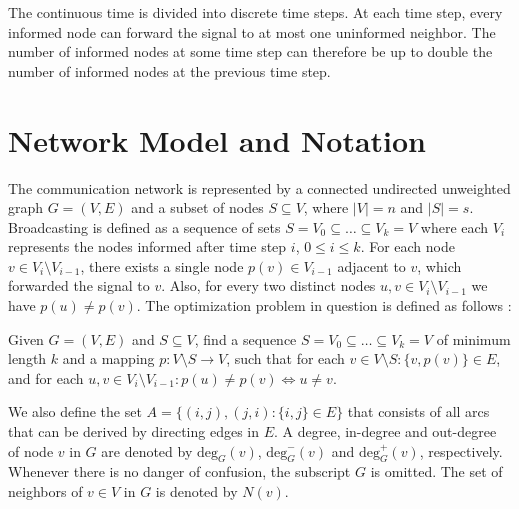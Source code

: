 The continuous time is divided into discrete time steps.
At each time step, every informed node can forward the signal to at most one uninformed neighbor.
The number of informed nodes at some time step can therefore be up to double the number of informed nodes at the previous time step.
%
\section{Network Model and Notation}

The communication network is represented by a connected undirected unweighted graph $G=(V,E)$ and a subset of nodes $S\subseteq V$, where $|V|=n$ and $|S|=s$. 
Broadcasting is defined as a sequence of sets $S=V_0\subseteq\dots\subseteq V_k = V$ where each $V_i$ represents the nodes informed after time step $i$, $0\leq i\leq k$.
For each node $v\in V_i\setminus V_{i-1}$, there exists a single node $p(v)\in V_{i-1}$ adjacent to $v$, which forwarded the signal to $v$.
Also, for every two distinct nodes $u,v\in V_i\setminus V_{i-1}$ we have $p(u)\neq p(v)$.
The optimization problem in question is defined as follows \cite{jansen95,middendorf93}:
\begin{problem}\label{prob:min}
Given $G=(V,E)$ and $S\subseteq V$, find a sequence $S=V_0\subseteq\dots\subseteq V_k=V$ of minimum length $k$ 
and a mapping $p:V\setminus S\to V$, such that for each $v\in V\setminus S:\{v,p(v)\}\in E$, and for each $u,v\in V_i\setminus V_{i-1}: p(u)\neq p(v)\Leftrightarrow u\neq v$.
\end{problem}
We also define the set $A=\{(i,j),(j,i):\{i,j\}\in E\}$ that consists of all arcs that can be derived by directing edges in $E$.
A degree, in-degree and out-degree of node $v$ in $G$ are denoted by $\text{deg}_G(v)$, $\text{deg}^-_G(v)$ and $\text{deg}^+_G(v)$, respectively.
Whenever there is no danger of confusion, the subscript $G$ is omitted.
The set of neighbors of $v\in V$ in $G$ is denoted by $N(v)$.


